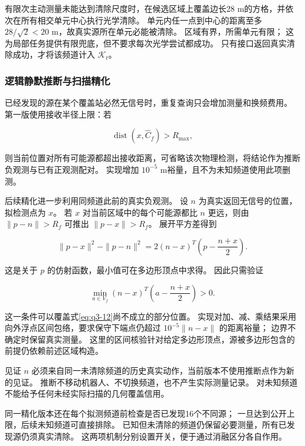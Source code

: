 \documentclass[UTF8,a4paper,zihao=5,fontset=fandol]{ctexart}
\begin{document}
有限次主动测量未能达到清除尺度时，在候选区域上覆盖边长28 m的方格，并依次在所有相交单元中心执行光学清除。
单元内任一点到中心的距离至多 \(28/\sqrt2<20\) m，故真实源所在单元必能被清除。
区域有界，所需单元有限；
这为局部任务提供有限兜底，但不要求每次光学尝试都成功。
只有接口返回真实清除成功，才将该频道计入 \(\mathcal K_t\)。

\subsubsection{逻辑静默推断与扫描精化}\label{sec:q3-5}

已经发现的源在某个覆盖站必然无信号时，重复查询只会增加测量和换频费用。
第一版使用接收半径上限：若

\begin{equation}\label{eq:q3-12}
\operatorname{dist}(x,\widehat C_f)>R_{\max},
\end{equation}

则当前位置对所有可能源都超出接收距离，可省略该次物理检测，将结论作为推断负观测与已有正观测配对。
实现增加 \(10^{-5}\) m裕量，且不为未知频道使用此项删测。

后续精化进一步利用同频道此前的真实负观测。
设 \(n\) 为真实返回无信号的位置，拟检测点为 \(x\)。
若 \(x\) 对当前区域中的每个可能源都比 \(n\) 更远，则由 \(\|p-n\|>R_f\) 可推出 \(\|p-x\|>R_f\)。
展开平方差得到

\begin{equation}\label{eq:q3-13}
\|p-x\|^2-\|p-n\|^2
=2(n-x)^T\left(p-\frac{n+x}{2}\right).
\end{equation}

这是关于 \(p\) 的仿射函数，最小值可在多边形顶点中求得。
因此只需验证

\begin{equation}\label{eq:q3-14}
\min_{a\in V_f}(n-x)^T\left(a-\frac{n+x}{2}\right)>0.
\end{equation}

这一条件可以覆盖式\eqref{eq:q3-12}尚不成立的部分位置。
实现对加、减、乘结果采用向外浮点区间包络，要求保守下端点仍超过 \(10^{-5}\|n-x\|\) 的距离裕量；
边界不确定时保留真实测量。
这里的区间核验针对给定多边形顶点，源被多边形包含的前提仍依赖前述区域构造。

见证 \(n\) 必须来自同一未清除频道的历史真实动作，当前版本不使用推断点作为新的见证。
推断不移动机器人、不切换频道，也不产生实际测量记录。
对未知频道不能给予任何未经实际扫描的几何覆盖信用。

同一精化版本还在每个拟测频道前检查是否已发现16个不同源；
一旦达到公开上限，后续未知频道可直接排除。
已知但未清除的频道仍保留必要测量，所有已发现源仍须真实清除。
这两项机制分别设置开关，便于通过消融区分各自作用。
\end{document}
